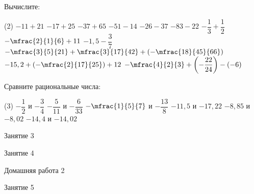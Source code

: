 \begin{homework}[number=1]
	\begin{listofex}
		\item Вычислите:
		\begin{tasks}(2)
			\task \( -11 + 21 \)
			\task \( -17+25 \)
			\task \( -37+65 \)
			\task \( -51-14 \)
			\task \( -26-37 \)
			\task \( -83-22 \)
			\task \( -\dfrac{1}{3}+\dfrac{1}{2} \)
			\task \( -\mfrac{2}{1}{6}+11 \)
			\task \( -1,5-\dfrac{3}{7} \)
			\task \( -\mfrac{3}{5}{21}+\mfrac{3}{17}{42}+\left(-\mfrac{18}{45}{66}\right) \)
			\task \( -15,2 + \left(-\mfrac{2}{17}{25}\right) + 12 \)
			\task \( -\mfrac{4}{2}{3} + \left(-\dfrac{22}{24}\right) - (-6) \)
		\end{tasks}
		\item Сравните рациональные числа:
		\begin{tasks}(3)
			\task \( -\dfrac{1}{2} \) и \( -\dfrac{3}{4} \)
			\task \( -\dfrac{5}{11} \) и \( -\dfrac{6}{33} \)
			\task \( -\mfrac{1}{5}{7} \) и \( -\dfrac{13}{8} \)
			\task \( -11,5 \) и \( -17,22 \)
			\task \( -8,85 \) и \( -8,02 \)
			\task \( -14,4 \) и \( -14,02 \)
		\end{tasks}
	\end{listofex}
\end{homework}

\begin{class}[number=3]
	\begin{listofex}
		\item Занятие 3 
	\end{listofex}
\end{class}

\begin{class}[number=4]
	\begin{listofex}
		\item Занятие 4
	\end{listofex}
\end{class}

\begin{homework}[number=2]
	\begin{listofex}
		\item Домашняя работа 2
	\end{listofex}
\end{homework}

\begin{class}[number=5]
	\begin{listofex}
		\item Занятие 5
	\end{listofex}
\end{class}

